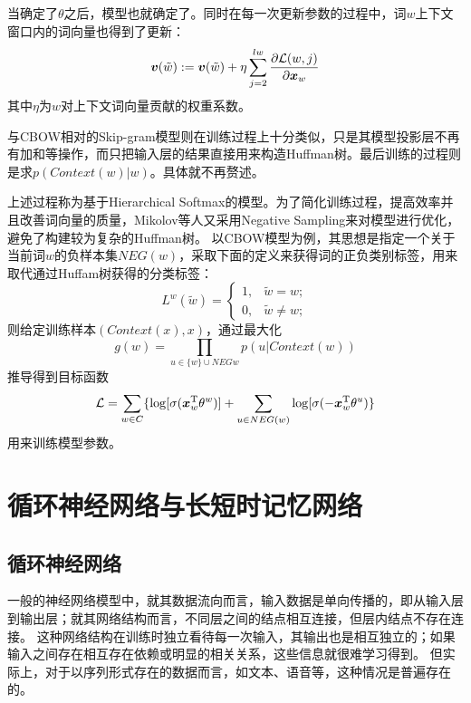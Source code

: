 当确定了$\theta$之后，模型也就确定了。同时在每一次更新参数的过程中，词$w$上下文窗口内的词向量也得到了更新：
\begin{equation}
    \boldsymbol{v}(\tilde{w}) := \boldsymbol{v}(\tilde{w}) + \eta\sum^{l{w}}_{j=2}\frac{\partial\mathcal{L}(w,j)}{\partial \boldsymbol{x}_w}
\end{equation}
其中$\eta$为$w$对上下文词向量贡献的权重系数。

与CBOW相对的Skip-gram模型则在训练过程上十分类似，只是其模型投影层不再有加和等操作，而只把输入层的结果直接用来构造Huffman树。最后训练的过程则是求$p(Context(w)|w)$。具体就不再赘述。

上述过程称为基于Hierarchical Softmax的模型。为了简化训练过程，提高效率并且改善词向量的质量，Mikolov等人又采用Negative Sampling来对模型进行优化，避免了构建较为复杂的Huffman树。
以CBOW模型为例，其思想是指定一个关于当前词$w$的负样本集$NEG(w)$，采取下面的定义来获得词的正负类别标签，用来取代通过Huffam树获得的分类标签：
\begin{equation}
    L^w(\tilde{w}) = \left\{
        \begin{aligned}
            1, &\tilde{w} = w;\\
            0, &\tilde{w} \neq w;
        \end{aligned}
    \right.
\end{equation}
则给定训练样本$(Context(x), x)$，通过最大化
\begin{equation}
    g(w) = \prod_{u\in\{w\}\cup NEG{w}}p(u|Context(w))
\end{equation}
推导得到目标函数
\begin{equation}
    \mathcal{L} = \sum_{w\in C}\{\log[\sigma(\boldsymbol{x}_w^\mathrm{T}\theta^w)] + \sum_{u\in NEG(w)}\log[\sigma(-\boldsymbol{x}_w^\mathrm{T}\theta^u)\}
\end{equation}
用来训练模型参数。

\section{循环神经网络与长短时记忆网络}
\subsection{循环神经网络}
一般的神经网络模型中，就其数据流向而言，输入数据是单向传播的，即从输入层到输出层；就其网络结构而言，不同层之间的结点相互连接，但层内结点不存在连接。
这种网络结构在训练时独立看待每一次输入，其输出也是相互独立的；如果输入之间存在相互存在依赖或明显的相关关系，这些信息就很难学习得到。
但实际上，对于以序列形式存在的数据而言，如文本、语音等，这种情况是普遍存在的。


